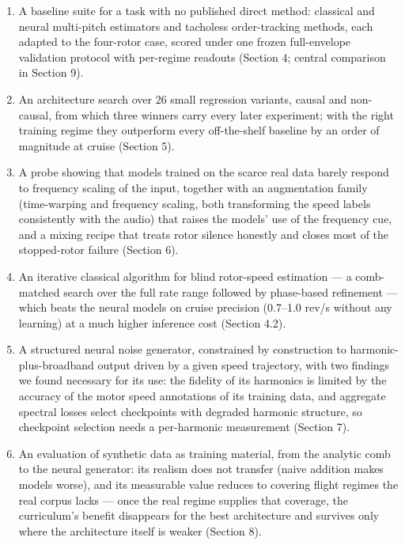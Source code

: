 \documentclass[journal]{IEEEtran}
\begin{document}
\begin{enumerate}
\item A baseline suite for a task with no published direct method: classical
  and neural multi-pitch estimators and tacholess order-tracking methods,
  each adapted to the four-rotor case, scored under one frozen
  full-envelope validation protocol with per-regime readouts (Section 4;
  central comparison in Section 9).
\item An architecture search over 26 small regression variants, causal and
  non-causal, from which three winners carry every later experiment; with
  the right training regime they outperform every off-the-shelf baseline
  by an order of magnitude at cruise (Section 5).
\item A probe showing that models trained on the scarce real data barely
  respond to frequency scaling of the input, together with an augmentation
  family (time-warping and frequency scaling, both transforming the speed
  labels consistently with the audio) that raises the models' use of the
  frequency cue, and a mixing recipe that treats rotor silence honestly and
  closes most of the stopped-rotor failure (Section 6).
\item An iterative classical algorithm for blind rotor-speed estimation ---
  a comb-matched search over the full rate range followed by phase-based
  refinement --- which beats the neural models on cruise precision
  (0.7--1.0 rev/s without any learning) at a much higher inference cost
  (Section 4.2).
\item A structured neural noise generator, constrained by construction to
  harmonic-plus-broadband output driven by a given speed trajectory, with
  two findings we found necessary for its use: the fidelity of its
  harmonics is limited by the accuracy of the motor speed annotations of
  its training data, and aggregate spectral losses select checkpoints with
  degraded harmonic structure, so checkpoint selection needs a per-harmonic
  measurement (Section 7).
\item An evaluation of synthetic data as training material, from the
  analytic comb to the neural generator: its realism does not transfer
  (naive addition makes models worse), and its measurable value reduces to
  covering flight regimes the real corpus lacks --- once the real regime
  supplies that coverage, the curriculum's benefit disappears for the best
  architecture and survives only where the architecture itself is weaker
  (Section 8).
\end{enumerate}
\end{document}
